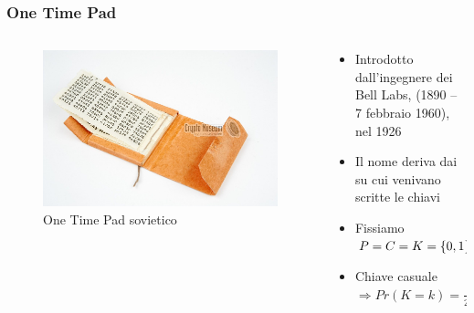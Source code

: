 	\begin{frame}
		\frametitle{One Time Pad}
		\begin{columns}
			\begin{column}{0.4\textwidth}
				\begin{center}
					\begin{figure}
						\includegraphics[width=\columnwidth]{img/otp.jpg}
						\caption{One Time Pad sovietico}
					\end{figure}
				\end{center}
			\end{column}
			\begin{column}{0.6\textwidth}
				\begin{itemize}
					\item Introdotto dall'ingegnere dei Bell Labs,  (1890 – 7 febbraio 1960), nel 1926
					\item Il nome deriva dai  su cui venivano scritte le chiavi
					\item Fissiamo $P = C = K = \{0,1\}^N \text{ con } N>0\text{ \textcolor{blue}{fissato} e \textcolor{blue}{noto}}$
					\item Chiave  casuale $\Rightarrow Pr(K=k)=\frac{1}{2^N}$
				\end{itemize}
			\end{column}
		\end{columns}
	\end{frame}


